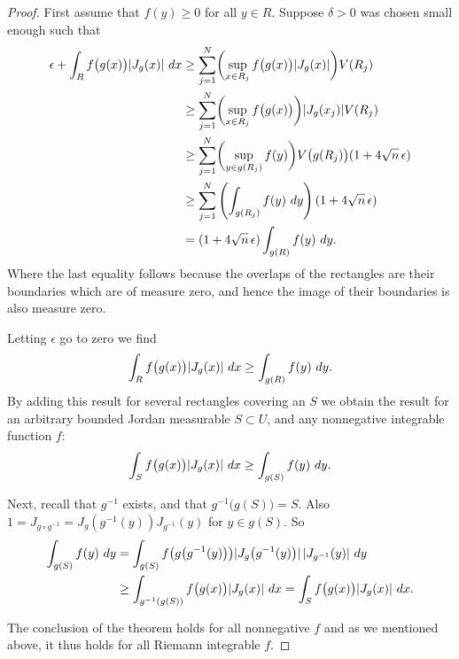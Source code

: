 \begin{proof}
First assume that $f(y) \geq 0$ for all $y \in R$.
Suppose $\delta > 0$ was chosen small enough such that
\begin{equation*}
\begin{split}
\epsilon + \int_R f\bigl(g(x)\bigr) \lvert {J_g(x)} \rvert ~ dx
& \geq
\sum_{j=1}^N \biggl(\sup_{x \in R_j} f\bigl(g(x)\bigr) \lvert {J_g(x)} \rvert \biggr) V(R_j)
\\
& \geq
\sum_{j=1}^N \biggl(\sup_{x \in R_j} f\bigl(g(x)\bigr) \biggr) \lvert {J_g(x_j)} \rvert V(R_j)
\\
& \geq
\sum_{j=1}^N \biggl(\sup_{y \in g(R_j)} f(y) \biggr)
V\bigl(g(R_j)\bigr)
(1+4\sqrt{n} \, \epsilon)
\\
& \geq
\sum_{j=1}^N \left(\int_{g(R_j)}f(y) ~dy \right)
(1+4\sqrt{n} \, \epsilon)
\\
& =
(1+4\sqrt{n} \, \epsilon)
\int_{g(R)} f(y) ~dy .
\end{split}
\end{equation*}
Where the last equality follows because the overlaps of the rectangles
are their boundaries which are of measure zero, and hence the image
of their boundaries is also measure zero.

Letting $\epsilon$ go to zero we find
\begin{equation*}
\int_R f\bigl(g(x)\bigr) \lvert {J_g(x)} \rvert ~ dx \geq \int_{g(R)} f(y) ~dy .
\end{equation*}
By adding this result for several rectangles covering an $S$ we obtain the
result for an arbitrary bounded Jordan measurable $S \subset U$,
and any nonnegative integrable function $f$:
\begin{equation*}
\int_S f\bigl(g(x)\bigr) \lvert {J_g(x)} \rvert ~ dx \geq \int_{g(S)} f(y) ~dy .
\end{equation*}

Next, recall that $g^{-1}$ exists, and that $g^{-1}\bigl(g(S)\bigr) = S$.
Also $1 = J_{g\circ g^{-1}} = J_g(g^{-1}(y))J_{g^{-1}}(y)$ for $y \in g(S)$.
So
\begin{equation*}
\begin{split}
\int_{g(S)} f(y) ~ dy
& =
\int_{g(S)} f\bigl(g\bigl(g^{-1}(y)\bigr)\bigr)
\lvert {J_g\bigl(g^{-1}(y)\bigr)} \rvert \, \lvert {J_{g^{-1}}(y)} \rvert ~ dy
\\
& \geq
\int_{g^{-1}(g(S))} f\bigl(g(x)\bigr) \lvert {J_g(x)} \rvert ~ dx
=
\int_{S} f\bigl(g(x)\bigr) \lvert {J_g(x)} \rvert ~ dx .
\end{split}
\end{equation*}

The conclusion of the theorem holds
for all nonnegative $f$ and as we
mentioned above, it thus holds for all Riemann integrable $f$.
\end{proof}

